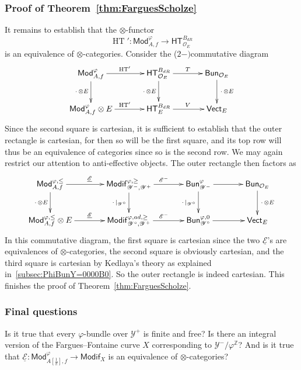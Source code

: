 \documentclass[11pt]{article}
\theoremstyle{definition}
\numberwithin{equation}{section}
\numberwithin{figure}{section}
\numberwithin{table}{section}
\newcommand{\Mod}{\mathsf{Mod}}
\newcommand{\Vect}{\mathsf{Vect}}
\newcommand{\Modif}{\mathsf{Modif}}
\newcommand{\HT}{\mathsf{HT}}
\newcommand{\Bun}{\mathsf{Bun}}
\DeclareMathOperator{\HTT}{HT}
\newcommand*{\dR}{dR}
\begin{document}
\subsubsection{Proof of Theorem~\ref{thm:FarguesScholze}}

It remains to establish that the $\otimes$-functor
\[
\HTT':\Mod_{A,f}^{\varphi}\rightarrow\HT_{\mathcal{O}_{E}}^{B_{\dR}}
\]
is an equivalence of $\otimes$-categories. Consider the ($2-)$commutative diagram
\[
\xymatrix@C=3pc@R=2pc{\Mod_{A,f}^{\varphi}\ar[r]^{\HTT'}\ar[d]_{{\,\cdot\,}\otimes E} & \HT_{\mathcal{O}_{E}}^{B_{\dR}}\ar[r]^{T}\ar[d]_{{\,\cdot\,}\otimes E} & \Bun_{\mathcal{O}_{E}}\ar[d]^{{\,\cdot\,}\otimes E}\\
\Mod_{A,f}^{\varphi}\otimes E\ar[r]^{\HTT'} & \HT_{E}^{B_{\dR}}\ar[r]^{V} & \Vect_{E} }
\]
Since the second square is cartesian, it is sufficient to establish that the outer rectangle is cartesian, for then so will be the first square, and its top row will thus be an equivalence of categories since so is the second row. We may again restrict our attention to anti-effective objects. The outer rectangle then factors as
\[
\xymatrix@C=3pc@R=2pc{\Mod_{A,f}^{\varphi,\leq}\ar[r]^{\underline{\mathscr{E}}}\ar[d]_{{\,\cdot\,}\otimes E} & \Modif_{\mathscr{Y}^{-},\mathscr{Y}^{+}}^{\varphi,\geq}\ar[r]^{\mathscr{E}^{-}}\ar[d]_{{\,\cdot\,}\vert_{\mathscr{Y}^{\circ}}} & \Bun_{\mathscr{Y}^{-}}^{\varphi}\ar[d]_{{\,\cdot\,}\vert_{\mathscr{Y}^{\circ}}}\ar[r] & \Bun_{\mathcal{O}_{E}}\ar[d]^{{\,\cdot\,}\otimes E}\\
\Mod_{A,f}^{\varphi,\leq}\otimes E\ar[r]^{\underline{\mathscr{E}}} & \Modif_{\mathscr{Y}^{\circ},\mathscr{Y}^{+}}^{\varphi,ad,\geq}\ar[r]^{\mathscr{E}^{-}} & \Bun_{\mathscr{Y}^{\circ}}^{\varphi,0}\ar[r] & \Vect_{E} }
\]
In this commutative diagram, the first square is cartesian since the two $\underline{\mathscr{E}}$'s are equivalences of $\otimes$-categories, the second square is obviously cartesian, and the third square is cartesian by Kedlaya's theory as explained in~\ref{subsec:PhiBunY=0000B0}. So the outer rectangle is indeed cartesian. This finishes the proof of Theorem~\ref{thm:FarguesScholze}.

\subsubsection{Final questions}

Is it true that every $\varphi$-bundle over $\mathscr{Y}^{+}$ is finite and free? Is there an integral version of the Fargues--Fontaine curve $X$ corresponding to $\mathscr{Y}^{-}/\varphi^{\mathbb{Z}}$? And is it true that $\underline{\mathcal{E}}:\Mod_{A[\frac{1}{\pi}],f}^{\varphi}\rightarrow\Modif_{X}$ is an equivalence of $\otimes$-categories?
\end{document}
